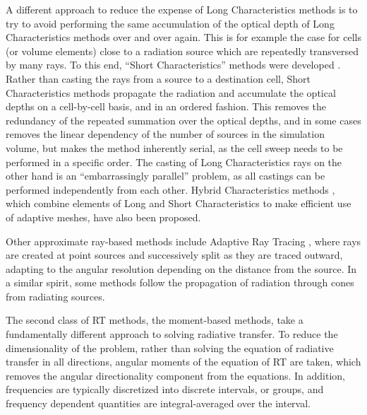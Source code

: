 A different approach to reduce the expense of Long Characteristics methods is to try to avoid
performing the same accumulation of the optical depth of Long Characteristics methods over and over
again. This is for example the case for cells (or volume elements) close to a radiation source
which are repeatedly transversed by many rays. To this end, ``Short Characteristics'' methods were
developed \citep[e.g.][]{mellemaPhotoevaporationClumpsPlanetary1998,
shapiroPhotoevaporationCosmologicalMinihaloes2004,mellema2RayNewMethod2006,
sarkarNewIonizationNetwork2021,jauraSPRAICouplingRadiative2018,
jauraSPRAIIIMultifrequencyRadiative2020,peterSweepMethodRadiative2023}. Rather than casting the
rays from a source to a destination cell, Short Characteristics methods propagate the radiation and
accumulate the optical depths on a cell-by-cell basis, and in an ordered fashion. This removes the
redundancy of the repeated summation over the optical depths, and in some cases removes the linear
dependency of the number of sources in the simulation volume, but makes the method inherently
serial, as the cell sweep needs to be performed in a specific order. The casting of Long
Characteristics rays on the other hand is an ``embarrassingly parallel'' problem, as all castings
can be performed independently from each other. Hybrid Characteristics methods
\citep[e.g.][]{rijkhorstHybridCharacteristics3D2006}, which combine elements of Long and Short
Characteristics to make efficient use of adaptive meshes, have also been proposed.

Other approximate ray-based methods include Adaptive Ray Tracing
\citep[e.g.][]{abelAdaptiveRayTracing2002, kimModelingUVRadiation2017}, where rays are created at
point sources and successively split as they are traced outward, adapting to the angular resolution
depending on the distance from the source. In a similar spirit, some methods
\citep[e.g.][]{petkovaNovelApproachAccurate2011, pawlikTRAPHICRadiativeTransfer2008,
pawlikMultifrequencyThermallyCoupled2011} follow the propagation of radiation through cones from
radiating sources.


The second class of RT methods, the moment-based methods, take a fundamentally different approach
to solving radiative transfer. To reduce the dimensionality of the problem, rather than solving the equation of radiative transfer in all directions, angular moments of the equation of RT are taken, which removes the angular directionality component from the equations. In addition, frequencies are typically discretized into discrete intervals, or groups, and frequency dependent quantities are integral-averaged over the interval.

